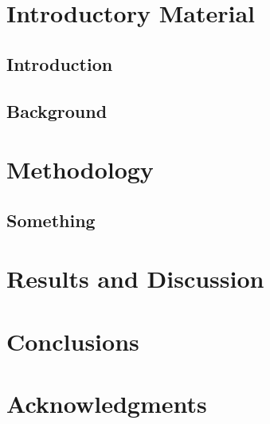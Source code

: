 \documentclass[12pt]{report}
\begin{document}
\setcounter{page}{1}
\chapter{Introductory Material} \label{sec:intro}  %
\section{Introduction}


\section{Background}


\chapter{Methodology} \label{sec:Methods}

\section{Something}
\chapter{Results and Discussion} \label{sec:results}



\newpage

\chapter{Conclusions} \label{sec:conclusions}

\newpage

\chapter{Acknowledgments} \label{sec:acknow}



\renewcommand{\bibname}{References}  %



\newpage

\appendix
\end{document}
